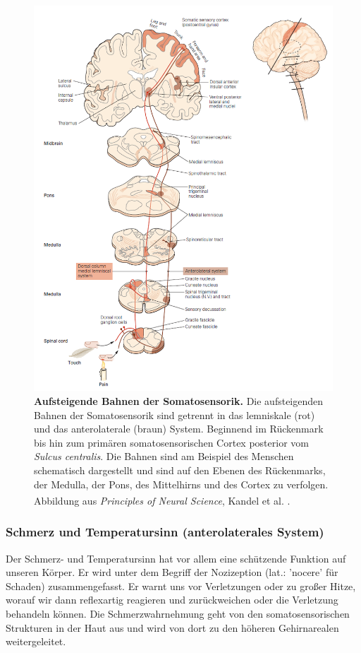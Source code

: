 \begin{figure}[H]
    \centering
    \includegraphics{pictures/somatosensory/pathway_somatosensory2.png}
    \caption[Aufsteigende Bahnen der Somatosensorik]{\textbf{Aufsteigende Bahnen der Somatosensorik.} Die aufsteigenden Bahnen der Somatosensorik sind getrennt in das lemniskale (rot) und das anterolaterale (braun) System. Beginnend im Rückenmark bis hin zum primären somatosensorischen Cortex posterior vom \textit{Sulcus centralis}. Die Bahnen sind am Beispiel des Menschen schematisch dargestellt und sind auf den Ebenen des Rückenmarks, der Medulla, der Pons, des Mittelhirns und des Cortex zu verfolgen.\\
    Abbildung aus \textit{Principles of Neural Science}, Kandel et al. \textsuperscript{\cite[Kap.~22]{kandel2013principles}}.}
    \label{fig:somato_pathway}
\end{figure}

\newpage    
\subsubsection{Schmerz und Temperatursinn (anterolaterales System)}
\label{subsubsec:Schmerzsinn}
Der Schmerz- und Temperatursinn   hat vor allem eine schützende Funktion auf unseren Körper. Er wird unter dem Begriff der Nozizeption (lat.: 'nocere' für Schaden) zusammengefasst. Er warnt uns vor Verletzungen oder zu großer Hitze, worauf wir dann reflexartig reagieren und zurückweichen oder die Verletzung behandeln können. Die Schmerzwahrnehmung geht von den somatosensorischen Strukturen in der Haut aus und wird von dort zu den höheren Gehirnarealen weitergeleitet.

